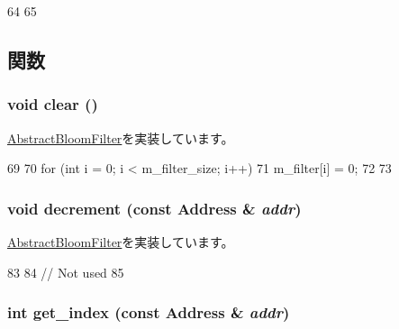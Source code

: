 \begin{DoxyCode}
64 {
65 }
\end{DoxyCode}


\subsection{関数}
\hypertarget{classBulkBloomFilter_ac8bb3912a3ce86b15842e79d0b421204}{
\subsubsection[{clear}]{\setlength{\rightskip}{0pt plus 5cm}void clear ()}}
\label{classBulkBloomFilter_ac8bb3912a3ce86b15842e79d0b421204}


\hyperlink{classAbstractBloomFilter_a5eeb94d22b8366d1b68d0614384802fe}{AbstractBloomFilter}を実装しています。


\begin{DoxyCode}
69 {
70     for (int i = 0; i < m_filter_size; i++) {
71         m_filter[i] = 0;
72     }
73 }
\end{DoxyCode}
\hypertarget{classBulkBloomFilter_addb6b805abb8328082a24926f2bf8c84}{
\subsubsection[{decrement}]{\setlength{\rightskip}{0pt plus 5cm}void decrement (const {\bf Address} \& {\em addr})}}
\label{classBulkBloomFilter_addb6b805abb8328082a24926f2bf8c84}


\hyperlink{classAbstractBloomFilter_aa387151f4ab03c6cd497d4385e34c21a}{AbstractBloomFilter}を実装しています。


\begin{DoxyCode}
83 {
84     // Not used
85 }
\end{DoxyCode}
\hypertarget{classBulkBloomFilter_a0a9fd2f2f75033080fc27830f7c0fe64}{
\subsubsection[{get\_\-index}]{\setlength{\rightskip}{0pt plus 5cm}int get\_\-index (const {\bf Address} \& {\em addr})}}
\label{classBulkBloomFilter_a0a9fd2f2f75033080fc27830f7c0fe64}



